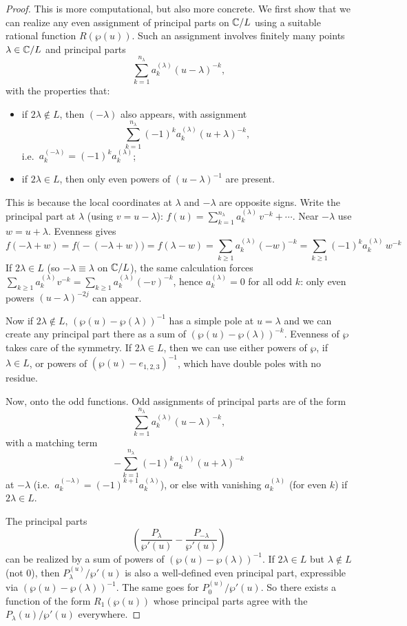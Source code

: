 \documentclass[12pt]{article}
\begin{document}
\begin{proof}
This is more computational, but also more concrete. 
We first show that we can realize any even assignment of principal parts on $\mathbb{C}/L$ using a suitable rational function $R(\wp(u))$. 
Such an assignment involves finitely many points $\lambda \in \mathbb{C}/L$ and principal parts
\[
    \sum_{k=1}^{n_\lambda} a^{(\lambda)}_k (u - \lambda)^{-k},
\]
with the properties that:
\begin{itemize}
    \item if $2\lambda \notin L$, then $(-\lambda)$ also appears, with assignment
    \[
        \sum_{k=1}^{n_\lambda} (-1)^k a^{(\lambda)}_k (u + \lambda)^{-k},
    \]
    i.e.\ $a_k^{(-\lambda)} = (-1)^k a_k^{(\lambda)}$;
    \item if $2\lambda \in L$, then only even powers of $(u - \lambda)^{-1}$ are present.
\end{itemize}

This is because the local coordinates at $\lambda$ and $-\lambda$ are opposite signs. Write the principal part at $\lambda$ (using $v=u-\lambda$): $f(u)=\sum_{k=1}^{n_\lambda} a_k^{(\lambda)}\,v^{-k}+\cdots$. Near $-\lambda$ use $w=u+\lambda$. Evenness gives \[f(-\lambda+w)=f\bigl(-(-\lambda+w)\bigr)=f(\lambda-w) =\sum_{k\ge1} a_k^{(\lambda)}(-w)^{-k} =\sum_{k\ge1} (-1)^k a_k^{(\lambda)}\,w^{-k}\]
If $2\lambda\in L$ (so $-\lambda\equiv\lambda$ on $\mathbb{C}/L$), the same calculation forces $\sum_{k\ge1} a_k^{(\lambda)} v^{-k}=\sum_{k\ge1} a_k^{(\lambda)}(-v)^{-k}$, hence $a_k^{(\lambda)}=0$ for all odd $k$: only even powers $(u-\lambda)^{-2j}$ can appear.

Now if $2\lambda \notin L$, $(\wp(u) - \wp(\lambda))^{-1}$ has a simple pole at $u=\lambda$ and we can create any principal part there as a sum of $(\wp(u) - \wp(\lambda))^{-k}$. 
Evenness of $\wp$ takes care of the symmetry. 
If $2\lambda \in L$, then we can use either powers of $\wp$, if $\lambda \in L$, or powers of $(\wp(u) - e_{1,2,3})^{-1}$, which have double poles with no residue.

Now, onto the odd functions. 
Odd assignments of principal parts are of the form
\[
    \sum_{k=1}^{n_\lambda} a^{(\lambda)}_k (u - \lambda)^{-k},
\]
with a matching term
\[
    -\sum_{k=1}^{n_\lambda} (-1)^k a^{(\lambda)}_k (u + \lambda)^{-k}
\]
at $-\lambda$ (i.e.\ $a^{(-\lambda)}_k = (-1)^{k+1} a^{(\lambda)}_k$), 
or else with vanishing $a^{(\lambda)}_k$ (for even $k$) if $2\lambda \in L$.

The principal parts
\[
    \left( \frac{P_\lambda}{\wp'(u)} - \frac{P_{-\lambda}}{\wp'(u)} \right)
\]
can be realized by a sum of powers of $(\wp(u) - \wp(\lambda))^{-1}$. 
If $2\lambda \in L$ but $\lambda \notin L$ (not $0$), then $P_\lambda^{(u)}/\wp'(u)$ is also a well-defined even principal part, expressible via $(\wp(u) - \wp(\lambda))^{-1}$. 
The same goes for $P_0^{(u)}/\wp'(u)$. 
So there exists a function of the form $R_1(\wp(u))$ whose principal parts agree with the $P_\lambda(u)/\wp'(u)$ everywhere. 


\end{proof}
\end{document}

